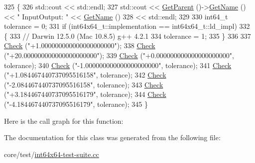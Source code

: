 \begin{DoxyCode}
325 \{
326   std::cout << std::endl;
327   std::cout << \hyperlink{classns3_1_1TestCase_af41db0462b844c9f81838d0e61ecd563}{GetParent} ()->\hyperlink{classns3_1_1TestCase_a28f7bb59669c24dae1c290fc17fc9b62}{GetName} () << \textcolor{stringliteral}{" InputOutput: "} << 
      \hyperlink{classns3_1_1TestCase_a28f7bb59669c24dae1c290fc17fc9b62}{GetName} ()
328             << std::endl;
329 
330   int64\_t tolerance = 0;
331   \textcolor{keywordflow}{if} (int64x64\_t::implementation == int64x64\_t::ld\_impl)
332     \{
333       \textcolor{comment}{// Darwin 12.5.0 (Mac 10.8.5) g++ 4.2.1}
334       tolerance = 1;
335     \}
336   
337   \hyperlink{classns3_1_1int64x64_1_1test_1_1Int64x64InputOutputTestCase_a6f7e206318aaae2804084d97e2c1676a}{Check} (\textcolor{stringliteral}{"+1.000000000000000000000"});
338   \hyperlink{classns3_1_1int64x64_1_1test_1_1Int64x64InputOutputTestCase_a6f7e206318aaae2804084d97e2c1676a}{Check} (\textcolor{stringliteral}{"+20.000000000000000000000"});
339   \hyperlink{classns3_1_1int64x64_1_1test_1_1Int64x64InputOutputTestCase_a6f7e206318aaae2804084d97e2c1676a}{Check} (\textcolor{stringliteral}{"+0.000000000000000000000"}, tolerance);
340   \hyperlink{classns3_1_1int64x64_1_1test_1_1Int64x64InputOutputTestCase_a6f7e206318aaae2804084d97e2c1676a}{Check} (\textcolor{stringliteral}{"-1.000000000000000000000"}, tolerance);
341   \hyperlink{classns3_1_1int64x64_1_1test_1_1Int64x64InputOutputTestCase_a6f7e206318aaae2804084d97e2c1676a}{Check} (\textcolor{stringliteral}{"+1.084467440737095516158"}, tolerance);
342   \hyperlink{classns3_1_1int64x64_1_1test_1_1Int64x64InputOutputTestCase_a6f7e206318aaae2804084d97e2c1676a}{Check} (\textcolor{stringliteral}{"-2.084467440737095516158"}, tolerance);
343   \hyperlink{classns3_1_1int64x64_1_1test_1_1Int64x64InputOutputTestCase_a6f7e206318aaae2804084d97e2c1676a}{Check} (\textcolor{stringliteral}{"+3.184467440737095516179"}, tolerance);
344   \hyperlink{classns3_1_1int64x64_1_1test_1_1Int64x64InputOutputTestCase_a6f7e206318aaae2804084d97e2c1676a}{Check} (\textcolor{stringliteral}{"-4.184467440737095516179"}, tolerance);
345 \}
\end{DoxyCode}


Here is the call graph for this function\+:




The documentation for this class was generated from the following file\+:\begin{DoxyCompactItemize}
\item 
core/test/\hyperlink{int64x64-test-suite_8cc}{int64x64-\/test-\/suite.\+cc}\end{DoxyCompactItemize}
